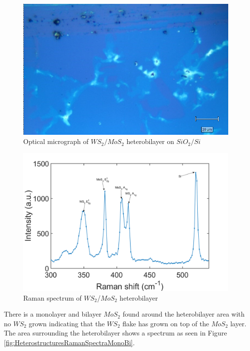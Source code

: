 \begin{figure}[H]
	\begin{center}
		\includegraphics[scale=0.5]{Heterostructures/OmSi.png}
		\caption{Optical micrograph of $WS_2/MoS_2$ heterobilayer on $SiO_2/Si$}
		\label{fig:HeterostructureOMSi}
	\end{center}
\end{figure}

\begin{figure}[H]
	\begin{center}
		\includegraphics[scale=0.3]{Heterostructures/RamanSpectrum2.png}
		\caption{Raman spectrum of $WS_2$/$MoS_2$ heterobilayer}
		\label{fig:HeterostructureRamanSpectrum}
	\end{center}
\end{figure}

There is a monolayer and bilayer $MoS_2$ found around the heterobilayer area with no $WS_2$ grown  indicating that the $WS_2$ flake has grown on top of the $MoS_2$ layer. The area surrounding the heterobilayer shows a spectrum as seen in Figure \ref{fig:HeterostructuresRamanSpectraMonoBi}. 

